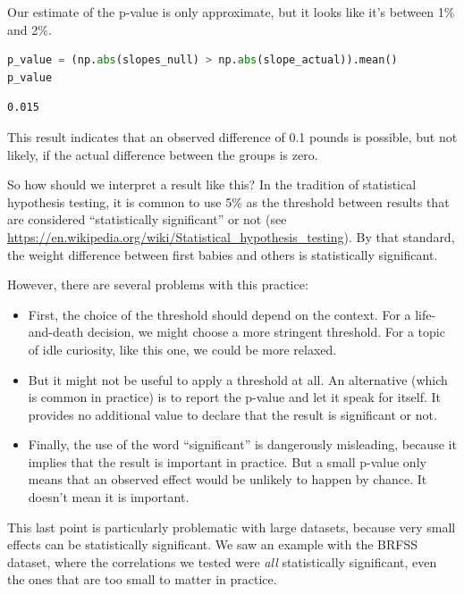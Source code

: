 Our estimate of the p-value is only approximate, but it looks like it's
between 1\% and 2\%.

\begin{lstlisting}[language=Python,style=source]
p_value = (np.abs(slopes_null) > np.abs(slope_actual)).mean()
p_value
\end{lstlisting}

\begin{lstlisting}[style=output]
0.015
\end{lstlisting}

This result indicates that an observed difference of 0.1 pounds is
possible, but not likely, if the actual difference between the groups is
zero.

So how should we interpret a result like this? In the tradition of
statistical hypothesis testing, it is common to use 5\% as the threshold
between results that are considered ``statistically significant'' or not
(see
\url{https://en.wikipedia.org/wiki/Statistical_hypothesis_testing}). By
that standard, the weight difference between first babies and others is
statistically significant.

However, there are several problems with this practice:

\begin{itemize}
\item
  First, the choice of the threshold should depend on the context. For a
  life-and-death decision, we might choose a more stringent threshold.
  For a topic of idle curiosity, like this one, we could be more
  relaxed.
\item
  But it might not be useful to apply a threshold at all. An alternative
  (which is common in practice) is to report the p-value and let it
  speak for itself. It provides no additional value to declare that the
  result is significant or not.
\item
  Finally, the use of the word ``significant'' is dangerously
  misleading, because it implies that the result is important in
  practice. But a small p-value only means that an observed effect would
  be unlikely to happen by chance. It doesn't mean it is important.
\end{itemize}

This last point is particularly problematic with large datasets, because
very small effects can be statistically significant. We saw an example
with the BRFSS dataset, where the correlations we tested were \emph{all}
statistically significant, even the ones that are too small to matter in
practice.

